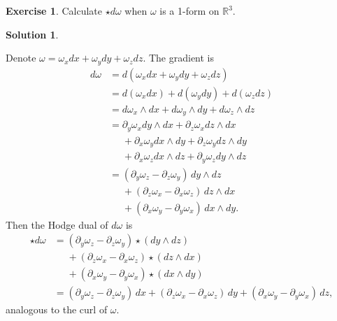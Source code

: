 \documentclass[11pt, a4paper]{report}
\theoremstyle{definition}
\newtheorem{ex}{Exercise}[part]
\newtheorem{sol}{Solution}[part]
\begin{document}
\begin{ex}

Calculate $\star d\omega$ when $\omega$ is a 1-form on $\mathbb{R}^3$.

\end{ex}

\begin{sol}\label{sol:curl1form}

Denote $\omega = \omega_x dx + \omega_y dy + \omega_z dz$. The gradient is
\begin{align*}
    d\omega &= d(\omega_x dx + \omega_y dy + \omega_z dz) \\
        &= d(\omega_x dx) + d(\omega_y dy) + d(\omega_z dz) \\
        &= d\omega_x \wedge dx + d\omega_y \wedge dy + d\omega_z \wedge dz \\
        &= \partial_y \omega_x dy \wedge dx + \partial_z \omega_x dz \wedge dx \\
        &\mathrel{\phantom{=}}{} + \partial_x \omega_y dx \wedge dy + \partial_z \omega_y dz \wedge dy \\
        &\mathrel{\phantom{=}}{} + \partial_x \omega_z dx \wedge dz + \partial_y \omega_z dy \wedge dz \\
        &= (\partial_y \omega_z - \partial_z \omega_y) \, dy \wedge dz \\
        &\mathrel{\phantom{=}}{} + (\partial_z \omega_x - \partial_x \omega_z) \, dz \wedge dx \\
        &\mathrel{\phantom{=}}{} +(\partial_x \omega_y - \partial_y \omega_x) \, dx \wedge dy.
\end{align*}
Then the Hodge dual of $d\omega$ is
\begin{align*}
    \star d\omega &= (\partial_y \omega_z - \partial_z \omega_y) \star (dy \wedge dz) \\
        &\mathrel{\phantom{=}}{} + (\partial_z \omega_x - \partial_x \omega_z) \star (dz \wedge dx) \\
        &\mathrel{\phantom{=}}{} + (\partial_x \omega_y - \partial_y \omega_x) \star (dx \wedge dy) \\
        &= \left(\partial_y \omega_z - \partial_z \omega_y\right) \, dx
            + \left(\partial_z \omega_x - \partial_x \omega_z\right) \, dy
            + \left(\partial_x \omega_y - \partial_y \omega_x\right) \, dz,
\end{align*}
analogous to the curl of $\omega$.

\end{sol}
\end{document}
